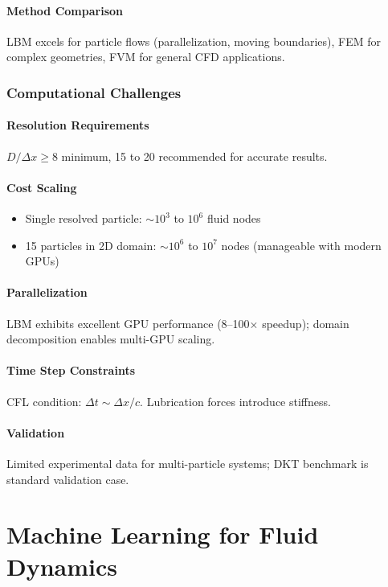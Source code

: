 \subsection{Method Comparison}
LBM excels for particle flows (parallelization, moving boundaries), FEM for complex geometries, FVM for general CFD applications.

\section{Computational Challenges}

\subsection{Resolution Requirements}
$D/\Delta x \geq 8$ minimum, 15 to 20 recommended for accurate results.

\subsection{Cost Scaling}
\begin{itemize}
    \item Single resolved particle: $\sim 10^3$ to $10^6$ fluid nodes
    \item 15 particles in 2D domain: $\sim 10^6$ to $10^7$ nodes (manageable with modern GPUs)
\end{itemize}

\subsection{Parallelization}
LBM exhibits excellent GPU performance (8--100$\times$ speedup); domain decomposition enables multi-GPU scaling.

\subsection{Time Step Constraints}
CFL condition: $\Delta t \sim \Delta x / c$. Lubrication forces introduce stiffness.

\subsection{Validation}
Limited experimental data for multi-particle systems; DKT benchmark is standard validation case.

\part{Machine Learning for Fluid Dynamics}

